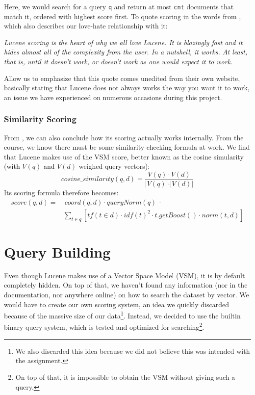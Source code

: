 \documentclass[11pt]{article}
\begin{document}
Here, we would search for a query \texttt{q} and return at most \texttt{cnt} documents that match it, ordered with highest score first. To quote scoring in the words from \cite{lucene}, which also describes our love-hate relationship with it:
\begin{displayquote}
    \textsl{Lucene scoring is the heart of why we all love Lucene. It is blazingly fast and it hides almost all of the complexity from the user. In a nutshell, it works. At least, that is, until it doesn't work, or doesn't work as one would expect it to work.}
\end{displayquote}

Allow us to emphasize that this quote comes unedited from their own website, basically stating that Lucene does not always works the way you want it to work, an issue we have experienced on numerous occasions during this project.

\subsubsection{Similarity Scoring}\label{sec:ss}
From \cite{lucene}, we can also conclude how its scoring actually works internally. From the course, we know there must be some similarity checking formula at work. We find that Lucene makes use of the \textsf{VSM score}, better known as the \textsf{cosine simularity} (with $V(q)$ and $V(d)$ weighed query vectors):
$$cosine\_similarity(q, d) = \frac{V(q)\cdot V(d)}{\vert V(q)\vert\cdot\vert V(d)\vert}$$
Its scoring formula therefore becomes:
\begin{align*}
    score(q, d) =&\ coord(q, d)\cdot queryNorm(q)\ \cdot\\
    &\sum_{t \in q}\left[tf(t\in d)\cdot idf(t)^2 \cdot t.getBoost()\cdot norm(t, d)\right]
\end{align*}

\section{Query Building}\label{sec:query}
Even though Lucene makes use of a Vector Space Model (VSM), it is by default completely hidden. On top of that, we haven't found any information (nor in the documentation, nor anywhere online) on how to search the dataset by vector. We would have to create our own scoring system, an idea we quickly discarded because of the massive size of our data\footnote{We also discarded this idea because we did not believe this was intended with the assignment.}. Instead, we decided to use the builtin binary query system, which is tested and optimized for searching\footnote{On top of that, it is impossible to obtain the VSM without giving such a query.}.
\end{document}

